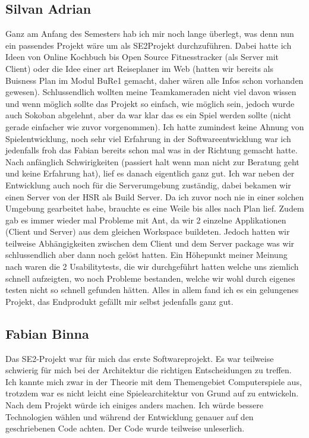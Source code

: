 \documentclass[11pt]{scrartcl}
\begin{document}
\subsection{Silvan Adrian}
Ganz am Anfang des Semesters hab ich mir noch lange überlegt, was denn nun ein
passendes Projekt wäre um als SE2Projekt durchzuführen.
Dabei hatte ich Ideen von Online Kochbuch bis Open Source Fitnesstracker 
(als Server mit Client) oder die Idee einer art Reiseplaner im Web (hatten wir 
bereits als Buisness Plan im Modul BuRe1 gemacht, daher wären 
alle Infos schon vorhanden gewesen).
Schlussendlich wollten meine Teamkameraden nicht viel davon wissen und
wenn möglich sollte das Projekt so einfach, wie möglich sein, jedoch wurde auch 
Sokoban abgelehnt, aber da war klar das es ein Spiel werden sollte 
(nicht gerade einfacher wie zuvor vorgenommen).
Ich hatte zumindest keine Ahnung von Spielentwicklung, noch sehr viel Erfahrung in 
der Softwareentwicklung war ich jedenfalls froh das Fabian bereits schon mal was in
der Richtung gemacht hatte.
Nach anfänglich Schwirigkeiten (passiert halt wenn man nicht zur 
Beratung geht und keine Erfahrung hat), lief es danach eigentlich ganz gut.
Ich war neben der Entwicklung auch noch für die Serverumgebung zuständig, dabei
bekamen wir einen Server von der HSR als Build Server.
Da ich zuvor noch nie in einer solchen Umgebung gearbeitet habe, brauchte es 
eine Weile bis alles nach Plan lief.
Zudem gab es immer wieder mal Probleme mit Ant, da wir 2 einzelne Applikationen
(Client und Server) aus dem gleichen Workspace buildeten. 
Jedoch hatten wir teilweise Abhängigkeiten zwischen dem Client und dem Server 
package was wir schlussendlich aber dann noch gelöst hatten.
Ein Höhepunkt meiner Meinung nach waren die 2 Usabilitytests, die 
wir durchgeführt hatten welche uns ziemlich schnell aufzeigten, wo noch Probleme
bestanden, welche wir wohl durch eigenes testen nicht so schnell gefunden 
hätten.
Alles in allem fand ich es ein gelungenes Projekt, das Endprodukt gefällt mir 
selbst jedenfalls ganz gut.
\newpage
\subsection{Fabian Binna}
Das SE2-Projekt war für mich das erste Softwareprojekt. Es war teilweise schwierig für mich bei der Architektur die richtigen Entscheidungen zu treffen. Ich kannte mich zwar in der Theorie mit dem Themengebiet Computerspiele aus, trotzdem war es nicht leicht eine Spielearchitektur von Grund auf zu entwickeln. Nach dem Projekt würde ich einiges anders machen. Ich würde bessere Technologien wählen und während der Entwicklung genauer auf den geschriebenen Code achten. Der Code wurde teilweise unleserlich.
\end{document}
